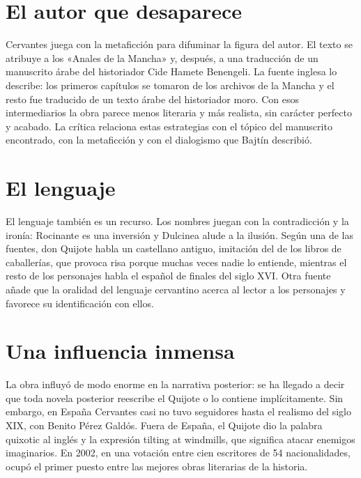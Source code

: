 \documentclass{book}
\begin{document}

\section{El autor que desaparece}

Cervantes juega con la metaficción para difuminar la figura del autor. El texto se atribuye a los «Anales de la Mancha» y, después, a una traducción de un manuscrito árabe del historiador Cide Hamete Benengeli. La fuente inglesa lo describe: los primeros capítulos se tomaron de los archivos de la Mancha y el resto fue traducido de un texto árabe del historiador moro. Con esos intermediarios la obra parece menos literaria y más realista, sin carácter perfecto y acabado. La crítica relaciona estas estrategias con el tópico del manuscrito encontrado, con la metaficción y con el dialogismo que Bajtín describió.


\section{El lenguaje}

El lenguaje también es un recurso. Los nombres juegan con la contradicción y la ironía: Rocinante es una inversión y Dulcinea alude a la ilusión. Según una de las fuentes, don Quijote habla un castellano antiguo, imitación del de los libros de caballerías, que provoca risa porque muchas veces nadie lo entiende, mientras el resto de los personajes habla el español de finales del siglo XVI. Otra fuente añade que la oralidad del lenguaje cervantino acerca al lector a los personajes y favorece su identificación con ellos.


\section{Una influencia inmensa}

La obra influyó de modo enorme en la narrativa posterior: se ha llegado a decir que toda novela posterior reescribe el Quijote o lo contiene implícitamente. Sin embargo, en España Cervantes casi no tuvo seguidores hasta el realismo del siglo XIX, con Benito Pérez Galdós. Fuera de España, el Quijote dio la palabra quixotic al inglés y la expresión tilting at windmills, que significa atacar enemigos imaginarios. En 2002, en una votación entre cien escritores de 54 nacionalidades, ocupó el primer puesto entre las mejores obras literarias de la historia.
\end{document}
